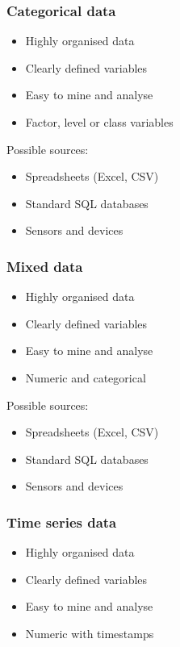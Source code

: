 \documentclass[11pt]{article}
\begin{document}
\subsubsection{Categorical data}
\label{sec:orgb911659}
\begin{itemize}
\item Highly organised data
\item Clearly defined variables
\item Easy to mine and analyse
\item Factor, level or class variables
\end{itemize}

Possible sources:
\begin{itemize}
\item Spreadsheets (Excel, CSV)
\item Standard SQL databases
\item Sensors and devices
\end{itemize}
\subsubsection{Mixed data}
\label{sec:orge3769f9}
\begin{itemize}
\item Highly organised data
\item Clearly defined variables
\item Easy to mine and analyse
\item Numeric and categorical
\end{itemize}

Possible sources:
\begin{itemize}
\item Spreadsheets (Excel, CSV)
\item Standard SQL databases
\item Sensors and devices
\end{itemize}
\subsubsection{Time series data}
\label{sec:org139cf79}
\begin{itemize}
\item Highly organised data
\item Clearly defined variables
\item Easy to mine and analyse
\item Numeric with timestamps
\end{itemize}
\end{document}

